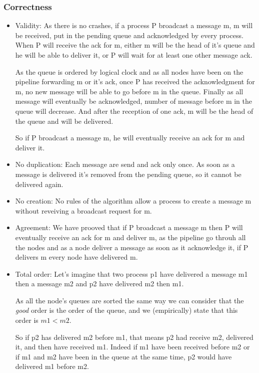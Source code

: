 \documentclass[a4paper]{article}
\begin{document}
\subsubsection{Correctness}
\begin{itemize}
    \item Validity: As there  is no crashes, if a process P broadcast a
        message m, m will be received, put in the pending queue and acknowledged 
        by every process. When P will receive the ack for m, either m will be
        the head of it's queue and he will be able to deliver it, or P will wait
        for at least one other message ack. 
        
        As the queue is ordered by logical clock and as all nodes have been on
        the pipeline forwarding m or it's ack, once P has received the
        acknowledgment for m, no new message will be able to go before m in the
        queue. Finally as all message will eventually be acknowledged, number of
        message before m in the queue will decrease. And after the reception of
        one ack, m will be the head of the queue and will be delivered.

        So if P broadcast a message m, he will eventually receive an ack
        for m and deliver it.
    \item No duplication: Each message are send and ack only once. As soon as a
        message is delivered it's removed from the pending queue, so it cannot
        be delivered again.
    \item No creation: No rules of the algorithm allow a process to
        create a message m without reveiving a broadcast request for m.
    \item Agreement: We have prooved that if P broadcast a message m
        then P will eventually receive an ack for m and deliver m, as
        the pipeline go throuh all the nodes and as a node deliver a
        message as soon as it acknowledge it, if P delivers m every node
        have delivered m.
    \item Total order: Let's imagine that two process p1 have delivered a message m1 then a
        message m2 and p2 have delivered m2 then m1. 
        
        As all the node's queues are sorted the same way we can consider that
        the \textit{good} order is the order of the queue, and we (empirically)
        state that this order is $m1<m2$.

        So if p2 has delivered m2 before m1, that means p2 had receive m2,
        delivered it, and then have received m1. Indeed if m1 have been received
        before m2 or if m1 and m2 have been in the queue at the same time, p2
        would have delivered m1 before m2.


\end{itemize}
\end{document}
